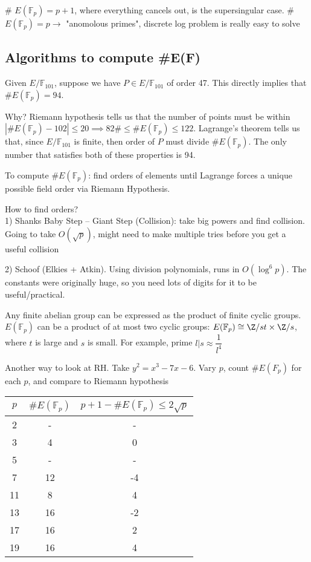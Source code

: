 \documentclass[twoside, 10pt]{article}
\newcommand{\F}{\mathbb{F}}
\begin{document}
\begin{rmk}
    \# $E(\F_p) = p + 1$, where everything cancels out, is the supersingular case.
    \# $E(\F_p) = p \to$ "anomolous primes", discrete log problem is really easy to solve %
\end{rmk}

\subsection{Algorithms to compute \#E(F)}
Given $E/\F_{101}$, suppose we have $P \in E/\F_{101}$ of order 47. This directly implies that \#$E(\F_p) = 94$.

Why? Riemann hypothesis tells us that the number of points must be within $|\#E(\F_p) - 102| \leq 20 \implies 82 \# \leq \#E(\F_p) \leq 122$. Lagrange's theorem tells us that, since $E/\F_{101}$ is finite, then order of $P$ must divide $\#E(\F_p)$. The only number that satisfies both of these properties is 94.

To compute $\#E(\F_p)$: find orders of elements until Lagrange forces a unique possible field order via Riemann Hypothesis.

How to find orders?\\
1) Shanks Baby Step -- Giant Step (Collision): take big powers and find collision. Going to take $O(\sqrt{p})$, might need to make multiple tries before you get a useful collision

2) Schoof (Elkies + Atkin). Using division polynomials, runs in $O(\log^6 p)$. The constants were originally huge, so you need lots of digits for it to be useful/practical.

\begin{rmk}
    Any finite abelian group can be expressed as the product of finite cyclic groups. $E(\F_p)$ can be a product of at most two cyclic groups: $E(\F_p) \cong \Z/st \times \Z/s$, where $t$ is large and $s$ is small. For example, prime $l | s \approx \dfrac{1}{l^4}$
\end{rmk}

\begin{exm*}
    Another way to look at RH. Take $y^2 = x^3 - 7x - 6$. Vary $p$, count $\#E(F_p)$ for each $p$, and compare to Riemann hypothesis
\end{exm*}

\begin{tabular}{c|c|c}
    $p$ & $\#E(\F_p)$ & $p + 1 - \#E(\F_p) \leq 2\sqrt{p}$\\
    \hline
    2 & - & -\\
    3 & 4 & 0\\
    5 & - & -\\
    7 & 12 & -4\\
    11 & 8 & 4\\
    13 & 16 & -2\\
    17 & 16 & 2\\
    19 & 16 & 4\\
\end{tabular}
\end{document}

